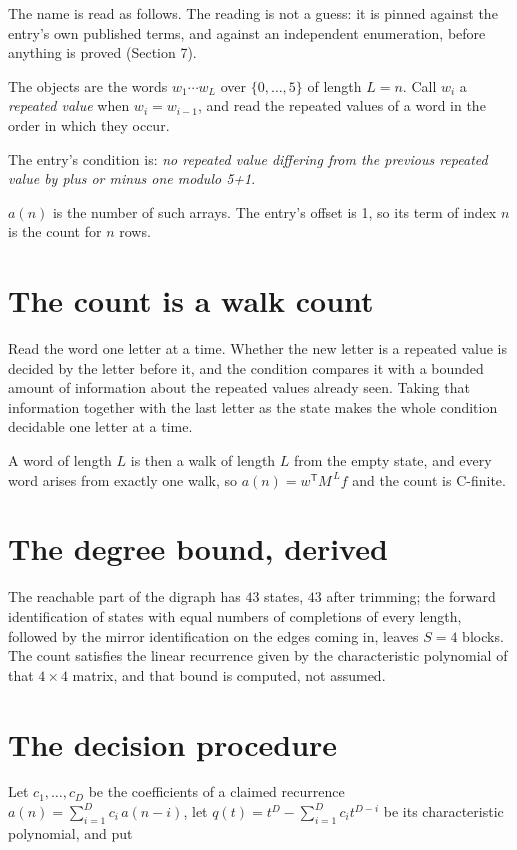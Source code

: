 \documentclass[11pt]{article}
\theoremstyle{definition}
\begin{document}
The name is read as follows. The reading is not a guess: it is pinned against the entry's own published terms, and against an independent enumeration, before anything is proved (Section 7).

The objects are the words $w_1\cdots w_L$ over $\{0,\dots,5\}$ of length $L = n$. Call $w_i$ a {\itshape repeated value} when $w_i = w_{i-1}$, and read the repeated values of a word in the order in which they occur.

The entry's condition is: {\itshape no repeated value differing from the previous repeated value by plus or minus one modulo 5+1}.

$a(n)$ is the number of such arrays. The entry's offset is 1, so its term of index $n$ is the count for $n$ rows.

\section{The count is a walk count}

Read the word one letter at a time. Whether the new letter is a repeated value is decided by the letter before it, and the condition compares it with a bounded amount of information about the repeated values already seen. Taking that information together with the last letter as the state makes the whole condition decidable one letter at a time.

A word of length $L$ is then a walk of length $L$ from the empty state, and every word arises from exactly one walk, so $a(n) = w^{\mathsf T}M^{\,L}f$ and the count is C-finite.

\section{The degree bound, derived}

The reachable part of the digraph has $43$ states, $43$ after trimming; the forward identification of states with equal numbers of completions of every length, followed by the mirror identification on the edges coming in, leaves $S = 4$ blocks. The count satisfies the linear recurrence given by the characteristic polynomial of that $4\times4$ matrix, and that bound is computed, not assumed.

\section{The decision procedure}

Let $c_1,\dots,c_D$ be the coefficients of a claimed recurrence $a(n) = \sum_{i=1}^{D} c_i\,a(n-i)$, let $q(t) = t^{D} - \sum_{i=1}^{D} c_i t^{D-i}$ be its characteristic polynomial, and put
\end{document}
